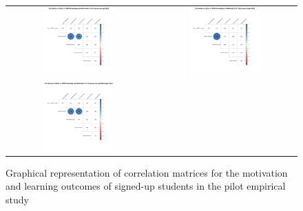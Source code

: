 

\begin{figure}[htb]
 \caption{Graphical representation of correlation matrices for the motivation and learning outcomes of signed-up students in the pilot empirical study}
 \label{fig:signedup-correlation-matrices-pilot-study}
 \centering
 \begin{tabular}{cc}
 \includegraphics[width=0.5\textwidth]{images/chap-evaluation/corr-signedup-pilot/non-gamified1.png}&
 \includegraphics[width=0.5\textwidth]{images/chap-evaluation/corr-signedup-pilot/ont-gamified1.png}\\
 \includegraphics[width=0.5\textwidth]{images/chap-evaluation/corr-signedup-pilot/non-gamifiedApprentice1.png}&

\end{tabular}
\end{figure}

